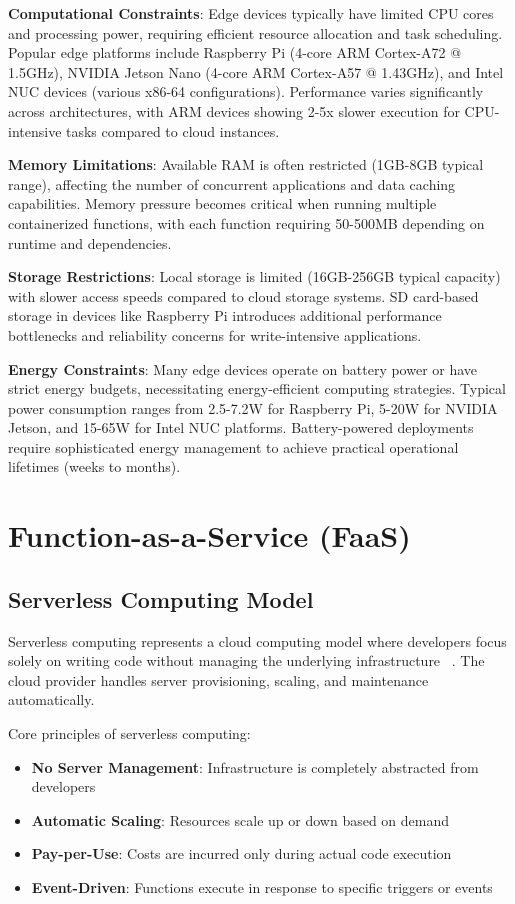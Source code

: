 \textbf{Computational Constraints}: Edge devices typically have limited CPU cores and processing power, requiring efficient resource allocation and task scheduling. Popular edge platforms include Raspberry Pi (4-core ARM Cortex-A72 @ 1.5GHz), NVIDIA Jetson Nano (4-core ARM Cortex-A57 @ 1.43GHz), and Intel NUC devices (various x86-64 configurations). Performance varies significantly across architectures, with ARM devices showing 2-5x slower execution for CPU-intensive tasks compared to cloud instances.

\textbf{Memory Limitations}: Available RAM is often restricted (1GB-8GB typical range), affecting the number of concurrent applications and data caching capabilities. Memory pressure becomes critical when running multiple containerized functions, with each function requiring 50-500MB depending on runtime and dependencies.

\textbf{Storage Restrictions}: Local storage is limited (16GB-256GB typical capacity) with slower access speeds compared to cloud storage systems. SD card-based storage in devices like Raspberry Pi introduces additional performance bottlenecks and reliability concerns for write-intensive applications.

\textbf{Energy Constraints}: Many edge devices operate on battery power or have strict energy budgets, necessitating energy-efficient computing strategies. Typical power consumption ranges from 2.5-7.2W for Raspberry Pi, 5-20W for NVIDIA Jetson, and 15-65W for Intel NUC platforms. Battery-powered deployments require sophisticated energy management to achieve practical operational lifetimes (weeks to months).

\section{Function-as-a-Service (FaaS)}

\subsection{Serverless Computing Model}

Serverless computing represents a cloud computing model where developers focus solely on writing code without managing the underlying infrastructure ~\cite{baldini2017serverless}. The cloud provider handles server provisioning, scaling, and maintenance automatically.

Core principles of serverless computing:
\begin{itemize}
    \item \textbf{No Server Management}: Infrastructure is completely abstracted from developers
    \item \textbf{Automatic Scaling}: Resources scale up or down based on demand
    \item \textbf{Pay-per-Use}: Costs are incurred only during actual code execution
    \item \textbf{Event-Driven}: Functions execute in response to specific triggers or events
\end{itemize}

